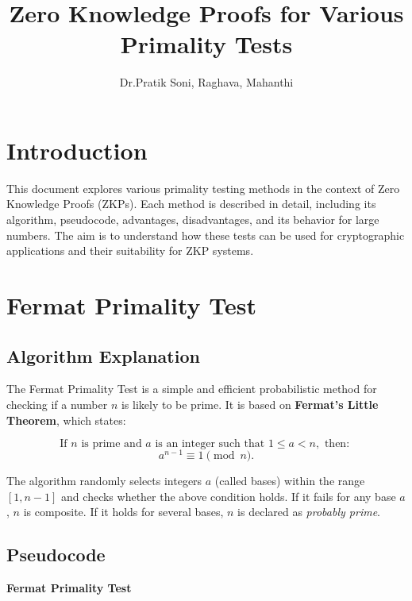 \documentclass[12pt]{article}
\title{Zero Knowledge Proofs for Various Primality Tests}
\author{Dr.Pratik Soni, Raghava, Mahanthi}
\date{}
\begin{document}
\maketitle

\tableofcontents

\newpage

\section{Introduction}

This document explores various primality testing methods in the context of Zero Knowledge Proofs (ZKPs). Each method is described in detail, including its algorithm, pseudocode, advantages, disadvantages, and its behavior for large numbers. The aim is to understand how these tests can be used for cryptographic applications and their suitability for ZKP systems.

\section{Fermat Primality Test}

\subsection*{Algorithm Explanation}

The Fermat Primality Test is a simple and efficient probabilistic method for checking if a number \( n \) is likely to be prime. It is based on \textbf{Fermat's Little Theorem}, which states:

\[
\text{If } n \text{ is prime and } a \text{ is an integer such that } 1 \leq a < n, \text{ then: }
\]
\[
a^{n-1} \equiv 1 \pmod{n}.
\]

The algorithm randomly selects integers \( a \) (called bases) within the range \( [1, n-1] \) and checks whether the above condition holds. If it fails for any base \( a \), \( n \) is composite. If it holds for several bases, \( n \) is declared as \emph{probably prime}.

\subsection*{Pseudocode}

\textbf{Fermat Primality Test}

\end{document}
